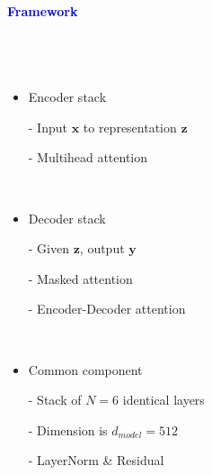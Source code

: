 \documentclass[professionalfont]{beamer}
\begin{document}
\begin{frame}

\begin{center}
    { \textbf{\textcolor{blue}{ {\fontsize{12}{14}\selectfont Framework} }} }
\end{center}
\\[0.2cm]

\begin{columns}
    {\fontsize{10}{14}\selectfont
        \begin{itemize}
            \item Encoder stack
    
            - Input \( \textbf{x} \) to representation \( \textbf{z} \)

            - Multihead attention

            \\[0.3cm]
            
            \item Decoder stack
    
            - Given \( \textbf{z} \), output \( \textbf{y} \)

            - Masked attention

            - Encoder-Decoder attention

            \\[0.3cm]

            \item Common component

            - Stack of \( N=6 \) identical layers

            - Dimension is \( d_{model} = 512 \)

            - LayerNorm \& Residual


\end{itemize}}
\end{columns}
\end{frame}
\end{document}
